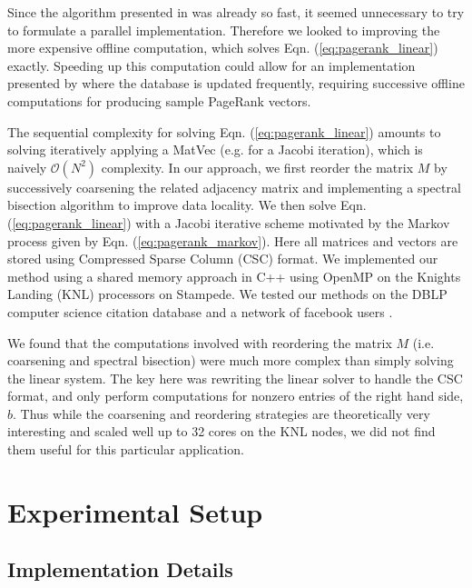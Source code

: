 \documentclass[11pt]{article}
\begin{document}
Since the algorithm presented in \cite{xie} was already so fast, it seemed
unnecessary to try to formulate a parallel implementation. Therefore we looked
to improving the more expensive offline computation, which solves Eqn.
(\ref{eq:pagerank_linear}) exactly. Speeding up this computation could allow for
an implementation presented by \cite{xie} where the database is updated
frequently, requiring successive offline computations for producing sample
PageRank vectors.

The sequential complexity for solving Eqn. (\ref{eq:pagerank_linear}) amounts to
solving iteratively applying a MatVec (e.g. for a Jacobi iteration), which is
naively $\mathcal{O}(N^2)$ complexity. In our approach, we first reorder the
matrix $M$ by successively coarsening the related adjacency matrix and
implementing a spectral bisection algorithm to improve data locality. We then
solve Eqn. (\ref{eq:pagerank_linear}) with a Jacobi iterative scheme motivated
by the Markov process given by Eqn. (\ref{eq:pagerank_markov}). Here all
matrices and vectors are stored using Compressed Sparse Column (CSC) format. We
implemented our method using a shared memory approach in C++ using OpenMP on the Knights Landing (KNL) processors on
Stampede. We tested our methods on the DBLP computer science citation database
\cite{dblp} and a network of facebook users \cite{facebook}. 

We found that the computations involved with reordering the matrix $M$ (i.e.
coarsening and spectral bisection) were much more complex than simply solving
the linear system. The key here was rewriting the linear solver to handle the
CSC format, and only perform computations for nonzero entries of the right hand
side, $b$. Thus while the coarsening and reordering strategies are theoretically
very interesting and scaled well up to 32 cores on the KNL nodes, 
we did not find them useful for this particular application. 






\section{Experimental Setup}
\subsection{Implementation Details}
\end{document}
